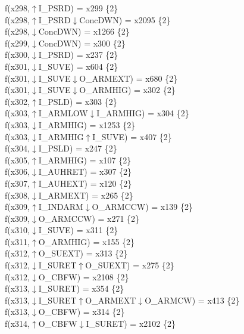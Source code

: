 f(x298,$\uparrow$I\_PSRD) = x299 \{2\} \\  
f(x298,$\uparrow$I\_PSRD$\downarrow$ConcDWN) = x2095 \{2\} \\  
f(x298,$\downarrow$ConcDWN) = x1266 \{2\} \\  
f(x299,$\downarrow$ConcDWN) = x300 \{2\} \\  
f(x300,$\downarrow$I\_PSRD) = x237 \{2\} \\  
f(x301,$\downarrow$I\_SUVE) = x604 \{2\} \\  
f(x301,$\downarrow$I\_SUVE$\downarrow$O\_ARMEXT) = x680 \{2\} \\  
f(x301,$\downarrow$I\_SUVE$\downarrow$O\_ARMHIG) = x302 \{2\} \\  
f(x302,$\uparrow$I\_PSLD) = x303 \{2\} \\  
f(x303,$\uparrow$I\_ARMLOW$\downarrow$I\_ARMHIG) = x304 \{2\} \\  
f(x303,$\downarrow$I\_ARMHIG) = x1253 \{2\} \\  
f(x303,$\downarrow$I\_ARMHIG$\uparrow$I\_SUVE) = x407 \{2\} \\  
f(x304,$\downarrow$I\_PSLD) = x247 \{2\} \\  
f(x305,$\uparrow$I\_ARMHIG) = x107 \{2\} \\  
f(x306,$\downarrow$I\_AUHRET) = x307 \{2\} \\  
f(x307,$\uparrow$I\_AUHEXT) = x120 \{2\} \\  
f(x308,$\downarrow$I\_ARMEXT) = x265 \{2\} \\  
f(x309,$\uparrow$I\_INDARM$\downarrow$O\_ARMCCW) = x139 \{2\} \\  
f(x309,$\downarrow$O\_ARMCCW) = x271 \{2\} \\  
f(x310,$\downarrow$I\_SUVE) = x311 \{2\} \\  
f(x311,$\uparrow$O\_ARMHIG) = x155 \{2\} \\  
f(x312,$\uparrow$O\_SUEXT) = x313 \{2\} \\  
f(x312,$\downarrow$I\_SURET$\uparrow$O\_SUEXT) = x275 \{2\} \\  
f(x312,$\downarrow$O\_CBFW) = x2108 \{2\} \\  
f(x313,$\downarrow$I\_SURET) = x354 \{2\} \\  
f(x313,$\downarrow$I\_SURET$\uparrow$O\_ARMEXT$\downarrow$O\_ARMCW) = x413 \{2\} \\  
f(x313,$\downarrow$O\_CBFW) = x314 \{2\} \\  
f(x314,$\uparrow$O\_CBFW$\downarrow$I\_SURET) = x2102 \{2\} \\  

